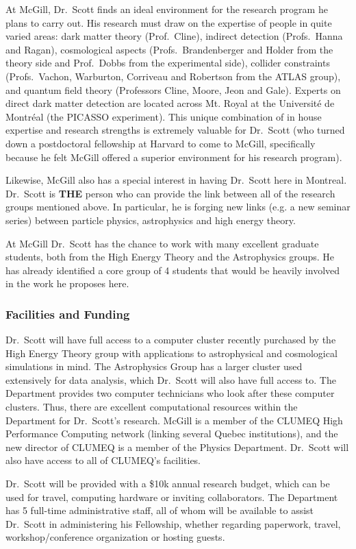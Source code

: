 \documentclass[10pt,oneside,onecolumn,a4paper]{article}
\begin{document}
At McGill, Dr.\ Scott finds an ideal environment for the
research program he plans to carry out. His research must draw
on the expertise of people in quite varied areas: dark matter theory
(Prof.\ Cline), indirect detection (Profs.\ Hanna and Ragan),
cosmological aspects (Profs.\ Brandenberger and Holder from the
theory side and Prof.\ Dobbs from the experimental side), 
collider constraints (Profs.\ Vachon, Warburton, Corriveau and
Robertson from the ATLAS group), and quantum field theory
(Professors Cline, Moore, Jeon and Gale). Experts on direct
dark matter detection are located across Mt. Royal at
the Universit\'e de Montr\'eal (the PICASSO experiment). This unique
combination of in house expertise and research strengths
is extremely valuable for Dr.\ Scott (who turned down a postdoctoral
fellowship at Harvard to come to McGill, specifically because he felt
McGill offered a superior environment for his research program).

Likewise, McGill also has a special interest in having
Dr.\ Scott here in Montreal. Dr.\ Scott is \textbf{THE} person who can provide
the link between all of the research groups mentioned above. In
particular, he is forging new links (e.g. a new seminar series)
between particle physics, astrophysics and high energy theory.

At McGill Dr.\ Scott has the chance to work with many excellent
graduate students, both from the High Energy Theory and the Astrophysics 
groups. He has already identified a core group of 4 students that would be heavily
involved in the work he proposes here.

\subsubsection*{Facilities and Funding}

Dr.\ Scott will have full access to a computer cluster recently
purchased by the High Energy Theory group with applications to
astrophysical and cosmological simulations in mind. The Astrophysics
Group has a larger cluster used extensively for data analysis, which Dr.\ Scott will also have full access to. 
The Department provides two computer technicians who look after these computer
clusters. Thus, there are excellent computational resources within
the Department for Dr.\ Scott's research. McGill is a member of the
CLUMEQ High Performance Computing network (linking several Quebec
institutions), and the new director of CLUMEQ is a member of the
Physics Department. Dr.\ Scott will also have access to all of CLUMEQ's
facilities.

Dr.\ Scott will be provided with a \$10k annual research budget, which can be used for travel, computing hardware or inviting collaborators.  The Department has 5 full-time administrative staff, all of whom will be available to assist Dr.\ Scott in administering his Fellowship, whether regarding paperwork, travel, workshop/conference organization or hosting guests.
\end{document}
